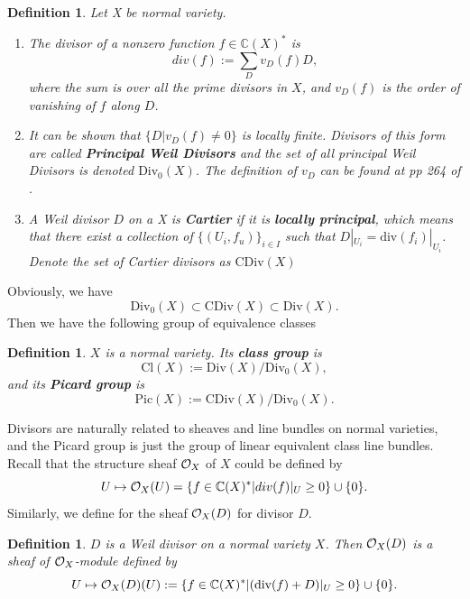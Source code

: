 \documentclass[11pt]{article}
\newtheorem{dfn}[thm]{Definition}
\newcommand{\cplx}{\mathbb C}
\newcommand{\calo}{{\cal O}}
\begin{document}
\begin{dfn}
	Let X be normal variety. 
	\begin{enumerate}[label=(\alph*)]
	\item The divisor of a nonzero function $f\in \cplx(X)^*$ is 
		\begin{equation*}
			div(f):=\sum_D v_D(f) D,
		\end{equation*}
		where the sum is over all the prime divisors in $X$, and $v_{D}(f)$ is the order of vanishing of $f$ along $D$. 
	\item It can be shown that $\{D|v_D(f)\neq0\}$ is locally finite. Divisors of this form are called \textbf{Principal Weil Divisors} and the set of all principal Weil Divisors is denoted $\text{Div}_0(X)$. The definition of $v_D$ can be found at pp 264 of \cite{ewald2012combinatorial}.
	\item A Weil divisor $D$ on a X is \textbf{Cartier} if it is \textbf{locally principal}, which means that there exist a collection of $\{(U_i, f_u)\}_{i\in I}$ such that $D|_{U_i}=\text{div}(f_i)|_{U_i}$. Denote the set of Cartier divisors as $\text{CDiv}(X)$
	\end{enumerate}
\end{dfn}
Obviously, we have
\begin{equation*}
	\text{Div}_0(X)\subset \text{CDiv}(X)\subset\text{Div}(X).
\end{equation*}
Then we have the following group of equivalence classes
\begin{dfn}
	$X$ is a normal variety. Its \textbf{class group} is
	\begin{equation*}
		\text{Cl}(X):=\text{Div}(X)/\text{Div}_0(X),
	\end{equation*}
	and its \textbf{Picard group} is 
	\begin{equation*}
		\text{Pic}(X):=\text{CDiv}(X)/\text{Div}_0(X).
	\end{equation*}
\end{dfn}
Divisors are naturally related to sheaves and line bundles on normal varieties, and the Picard group is just the group of linear equivalent class line bundles. Recall that the structure sheaf $\calo_X$ of $X$ could be defined by
\begin{equation*}
	U\mapsto\calo_X(U)=\{f\in \cplx(X)^*|div(f)|_U\geq0\}\cup\{0\}.
\end{equation*}
Similarly, we define for the sheaf $\calo_X(D)$ for divisor $D$.
\begin{dfn}
$D$ is a Weil divisor on a normal variety $X$. Then $\calo_X(D)$ is a sheaf of $\calo_X$-module defined by
\begin{equation*}
	U\mapsto\calo_X(D)(U):=\{f\in \cplx(X)^*|(\text{div}(f)+D)|_U\geq0\}\cup\{0\}.
\end{equation*}
\end{dfn}
\end{document}
